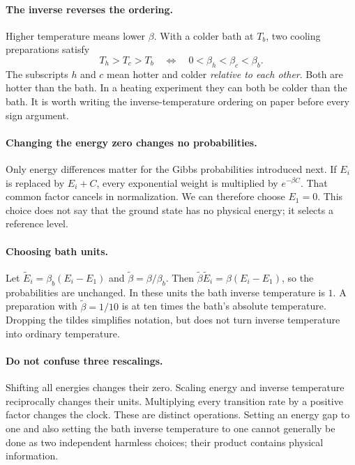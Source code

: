 \paragraph{The inverse reverses the ordering.}
Higher temperature means lower $\beta$. With a colder bath at $T_b$, two
cooling preparations satisfy
\[
T_h>T_c>T_b
\quad\Longleftrightarrow\quad
0<\beta_h<\beta_c<\beta_b.
\]
The subscripts $h$ and $c$ mean hotter and colder \emph{relative to each other}.
Both are hotter than the bath. In a heating experiment they can both be colder
than the bath. It is worth writing the inverse-temperature ordering on paper
before every sign argument.

\paragraph{Changing the energy zero changes no probabilities.}
Only energy differences matter for the Gibbs probabilities introduced next.
If $E_i$ is replaced by $E_i+C$, every exponential weight is multiplied by
$e^{-\beta C}$. That common factor cancels in normalization. We can therefore
choose $E_1=0$. This choice does not say that the ground state has no physical
energy; it selects a reference level.

\paragraph{Choosing bath units.}
Let $\widetilde E_i=\beta_b(E_i-E_1)$ and
$\widetilde\beta=\beta/\beta_b$. Then
$\widetilde\beta\widetilde E_i=\beta(E_i-E_1)$, so the probabilities are
unchanged. In these units the bath inverse temperature is $1$. A preparation
with $\widetilde\beta=1/10$ is at ten times the bath's absolute temperature.
Dropping the tildes simplifies notation, but does not turn inverse temperature
into ordinary temperature.

\paragraph{Do not confuse three rescalings.}
Shifting all energies changes their zero. Scaling energy and inverse
temperature reciprocally changes their units. Multiplying every transition
rate by a positive factor changes the clock. These are distinct operations.
Setting an energy gap to one and also setting the bath inverse temperature to
one cannot generally be done as two independent harmless choices; their
product contains physical information.

